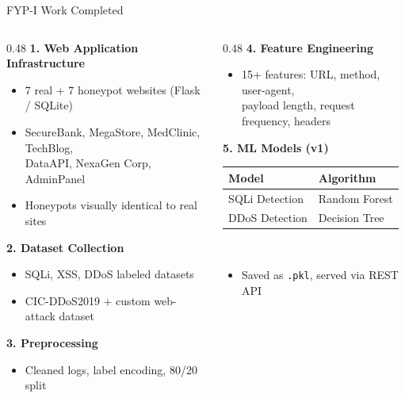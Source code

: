 \documentclass[aspectratio=169,12pt]{beamer}
\begin{document}
\begin{frame}{FYP-I Work Completed}
  \begin{columns}[T]
    \begin{column}{0.48\textwidth}
      \textbf{\textcolor{dcCyan}{1. Web Application Infrastructure}}
      \begin{itemize}\small
        \item 7 real + 7 honeypot websites (Flask / SQLite)
        \item SecureBank, MegaStore, MedClinic, TechBlog,\\DataAPI, NexaGen Corp, AdminPanel
        \item Honeypots visually identical to real sites
      \end{itemize}
      \vspace{0.25em}
      \textbf{\textcolor{dcCyan}{2. Dataset Collection}}
      \begin{itemize}\small
        \item SQLi, XSS, DDoS labeled datasets
        \item CIC-DDoS2019 + custom web-attack dataset
      \end{itemize}
      \vspace{0.25em}
      \textbf{\textcolor{dcCyan}{3. Preprocessing}}
      \begin{itemize}\small
        \item Cleaned logs, label encoding, 80/20 split
      \end{itemize}
    \end{column}
    \begin{column}{0.48\textwidth}
      \textbf{\textcolor{dcCyan}{4. Feature Engineering}}
      \begin{itemize}\small
        \item 15+ features: URL, method, user-agent,\\ payload length, request frequency, headers
      \end{itemize}
      \vspace{0.3em}
      \textbf{\textcolor{dcCyan}{5. ML Models (v1)}}\\[0.2em]
      \centering\small
      \begin{tabular}{@{}ll@{}}
        \toprule
        \rowcolor{dcMid}
        \textcolor{dcCyan}{Model} & \textcolor{dcCyan}{Algorithm}\\
        \midrule
        SQLi Detection & Random Forest\\
        DDoS Detection & Decision Tree\\
        \bottomrule
      \end{tabular}\\[0.3em]
      \raggedright
      \begin{itemize}\small
        \item Saved as \texttt{.pkl}, served via REST API
      \end{itemize}
    \end{column}
  \end{columns}
\end{frame}
\end{document}
